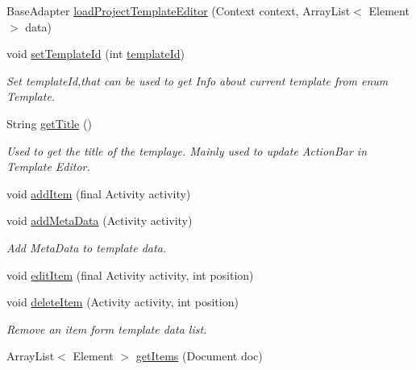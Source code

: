 \begin{DoxyCompactItemize}
\item 
Base\+Adapter \hyperlink{classorg_1_1buildmlearn_1_1toolkit_1_1templates_1_1InfoTemplate_a3133856410f82ddd51ebd42f54a56cf6}{load\+Project\+Template\+Editor} (Context context, Array\+List$<$ Element $>$ data)
\item 
void \hyperlink{classorg_1_1buildmlearn_1_1toolkit_1_1templates_1_1InfoTemplate_adfce9a41f5acc3f93b638835f7f00f9f}{set\+Template\+Id} (int \hyperlink{classorg_1_1buildmlearn_1_1toolkit_1_1templates_1_1InfoTemplate_a8aa87de71f3a80c02636551351a890cd}{template\+Id})
\begin{DoxyCompactList}\small\item\em Set template\+Id,that can be used to get Info about current template from enum Template. \end{DoxyCompactList}\item 
String \hyperlink{classorg_1_1buildmlearn_1_1toolkit_1_1templates_1_1InfoTemplate_aeff54c9ca6a2925582e01d6fffea0b71}{get\+Title} ()
\begin{DoxyCompactList}\small\item\em Used to get the title of the templaye. Mainly used to update Action\+Bar in Template Editor. \end{DoxyCompactList}\item 
void \hyperlink{classorg_1_1buildmlearn_1_1toolkit_1_1templates_1_1InfoTemplate_a397a72ab6a84e7352e8e2af283a9b4a8}{add\+Item} (final Activity activity)
\item 
void \hyperlink{classorg_1_1buildmlearn_1_1toolkit_1_1templates_1_1InfoTemplate_a270770a6ee6be078a19537fba014121b}{add\+Meta\+Data} (Activity activity)
\begin{DoxyCompactList}\small\item\em Add Meta\+Data to template data. \end{DoxyCompactList}\item 
void \hyperlink{classorg_1_1buildmlearn_1_1toolkit_1_1templates_1_1InfoTemplate_a959e9afa2bb71e903b575087515611a7}{edit\+Item} (final Activity activity, int position)
\item 
void \hyperlink{classorg_1_1buildmlearn_1_1toolkit_1_1templates_1_1InfoTemplate_ab0388f85502e6ed254c8de84b7cd4ed4}{delete\+Item} (Activity activity, int position)
\begin{DoxyCompactList}\small\item\em Remove an item form template data list. \end{DoxyCompactList}\item 
Array\+List$<$ Element $>$ \hyperlink{classorg_1_1buildmlearn_1_1toolkit_1_1templates_1_1InfoTemplate_a720895732bb2e94b7d0a119d7a6b0a6c}{get\+Items} (Document doc)

\end{DoxyCompactItemize}
